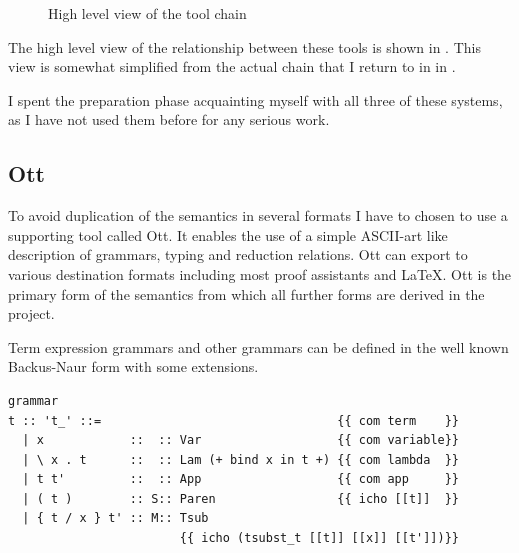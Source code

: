 \documentclass[12pt,twoside,notitlepage]{report}
\theoremstyle{plain}%
\theoremstyle{definition}
\theoremstyle{remark}
\begin{document}
\begin{figure}[H]
\centering
{}
\caption{High level view of the tool chain}
\label{fig:simpl_toolchain}
\end{figure}

The high level view of the relationship between these tools is shown in . This view is somewhat simplified from the actual chain that I return to in  in .

I spent the preparation phase acquainting myself with all three of these systems, as I have not used them before for any serious work.
\subsection{Ott}
To avoid duplication of the semantics in several formats I have to chosen to use a supporting tool called Ott\cite{Ott}. It enables the use of a simple ASCII-art like description of grammars, typing and reduction relations. Ott can export to various destination formats including most proof assistants and \LaTeX. Ott  is the primary form of the semantics from which all further forms are derived in the project.

Term expression grammars and other grammars can be defined in the well known Backus-Naur form with some extensions. \vspace{5mm}

\begin{minipage}{\linewidth}
\begin{lstlisting}[language={Ott}, caption={Ott grammar example}, label={lst:ottgrammarex}]
grammar
t :: 't_' ::=                                 {{ com term    }}
  | x            ::  :: Var                   {{ com variable}}
  | \ x . t      ::  :: Lam (+ bind x in t +) {{ com lambda  }}
  | t t'         ::  :: App                   {{ com app     }}
  | ( t )        :: S:: Paren                 {{ icho [[t]]  }} 
  | { t / x } t' :: M:: Tsub  
                        {{ icho (tsubst_t [[t]] [[x]] [[t']])}}
\end{lstlisting}
\end{minipage}
\end{document}
